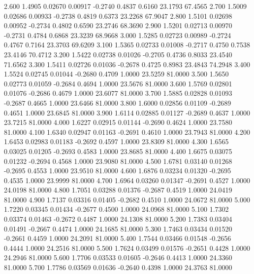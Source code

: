    2.600   1.4905   0.02670   0.00917  -0.2740   0.4837   0.6160  23.1793  67.4565
   2.700   1.5009   0.02686   0.00933  -0.2738   0.4819   0.6373  23.2268  67.9047
   2.800   1.5101   0.02698   0.00952  -0.2734   0.4802   0.6590  23.2746  68.3690
   2.900   1.5201   0.02713   0.00970  -0.2731   0.4784   0.6868  23.3239  68.9668
   3.000   1.5285   0.02723   0.00989  -0.2724   0.4767   0.7164  23.3703  69.6209
   3.100   1.5365   0.02733   0.01008  -0.2717   0.4750   0.7538  23.4146  70.4712
   3.200   1.5422   0.02738   0.01026  -0.2705   0.4736   0.8033  23.4540  71.6562
   3.300   1.5411   0.02726   0.01036  -0.2678   0.4725   0.8983  23.4843  74.2948
   3.400   1.5524   0.02745   0.01044  -0.2680   0.4709   1.0000  23.5259  81.0000
   3.500   1.5650   0.02773   0.01059  -0.2684   0.4694   1.0000  23.5676  81.0000
   3.600   1.5769   0.02801   0.01076  -0.2686   0.4679   1.0000  23.6077  81.0000
   3.700   1.5885   0.02828   0.01093  -0.2687   0.4665   1.0000  23.6466  81.0000
   3.800   1.6000   0.02856   0.01109  -0.2689   0.4651   1.0000  23.6845  81.0000
   3.900   1.6114   0.02885   0.01127  -0.2689   0.4637   1.0000  23.7215  81.0000
   4.000   1.6227   0.02915   0.01144  -0.2690   0.4624   1.0000  23.7580  81.0000
   4.100   1.6340   0.02947   0.01163  -0.2691   0.4610   1.0000  23.7943  81.0000
   4.200   1.6453   0.02983   0.01183  -0.2692   0.4597   1.0000  23.8309  81.0000
   4.300   1.6565   0.03025   0.01205  -0.2693   0.4583   1.0000  23.8685  81.0000
   4.400   1.6675   0.03075   0.01232  -0.2694   0.4568   1.0000  23.9080  81.0000
   4.500   1.6781   0.03140   0.01268  -0.2695   0.4553   1.0000  23.9510  81.0000
   4.600   1.6876   0.03234   0.01320  -0.2695   0.4535   1.0000  23.9999  81.0000
   4.700   1.6964   0.03260   0.01347  -0.2691   0.4527   1.0000  24.0198  81.0000
   4.800   1.7051   0.03288   0.01376  -0.2687   0.4519   1.0000  24.0419  81.0000
   4.900   1.7137   0.03316   0.01405  -0.2682   0.4510   1.0000  24.0672  81.0000
   5.000   1.7220   0.03345   0.01434  -0.2677   0.4500   1.0000  24.0968  81.0000
   5.100   1.7302   0.03374   0.01463  -0.2672   0.4487   1.0000  24.1308  81.0000
   5.200   1.7383   0.03404   0.01491  -0.2667   0.4474   1.0000  24.1685  81.0000
   5.300   1.7463   0.03434   0.01520  -0.2661   0.4459   1.0000  24.2091  81.0000
   5.400   1.7544   0.03466   0.01548  -0.2656   0.4444   1.0000  24.2516  81.0000
   5.500   1.7624   0.03499   0.01576  -0.2651   0.4428   1.0000  24.2946  81.0000
   5.600   1.7706   0.03533   0.01605  -0.2646   0.4413   1.0000  24.3360  81.0000
   5.700   1.7786   0.03569   0.01636  -0.2640   0.4398   1.0000  24.3763  81.0000
